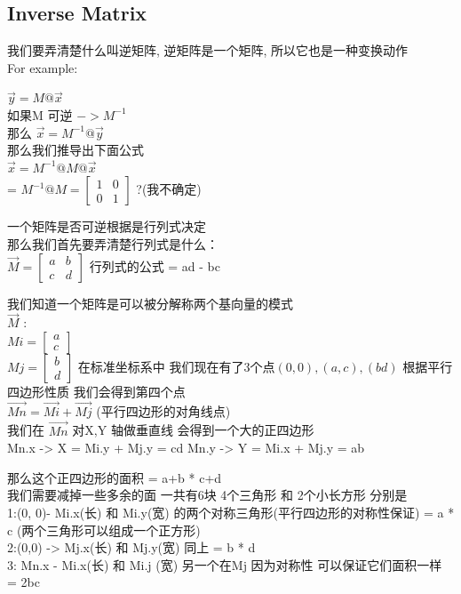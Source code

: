 \documentclass[12pt]{article}
\begin{document}
\begin{flushleft}
\section{Inverse Matrix}
我们要弄清楚什么叫逆矩阵,
逆矩阵是一个矩阵, 所以它也是一种变换动作 \\
For example:

$\vec{y} = M @ \vec{x}$ \\
如果M 可逆 $-> M^{-1}$ \\ 
那么  
$\vec{x} = M^{-1} @ \vec{y}$ \\ 
那么我们推导出下面公式 \\ 
$\vec{x} = M^{-1} @ M  @ \vec{x}$ \\ 
= $M^{-1} @ M  = \begin{bmatrix}
    1 & 0 \\
    0 & 1
\end{bmatrix}$ ?(我不确定)

一个矩阵是否可逆根据是行列式决定  \\
那么我们首先要弄清楚行列式是什么： \\
$\vec{M} = \begin{bmatrix}
    a  &  b  \\
    c  &  d  
\end{bmatrix}$
行列式的公式 =  ad - bc

我们知道一个矩阵是可以被分解称两个基向量的模式 \\
$\vec{M}$ : \\
$ Mi = \begin{bmatrix}
    a \\ 
    c 
\end{bmatrix}
$\\
$ Mj = \begin{bmatrix}
    b \\ 
    d 
\end{bmatrix}$
在标准坐标系中
我们现在有了3个点$(0,0), (a,c), (bd)$ 
根据平行四边形性质 我们会得到第四个点 \\
$\vec{Mn} =  \vec{Mi} + \vec{Mj}$ (平行四边形的对角线点) \\
我们在 $\vec{Mn}$ 对X,Y 轴做垂直线 会得到一个大的正四边形 \\
Mn.x -> X  = Mi.y  +  Mj.y = cd 
Mn.y -> Y  = Mi.x  +  Mj.y = ab 

那么这个正四边形的面积 = a+b * c+d \\ 
我们需要减掉一些多余的面 一共有6块 4个三角形 和 2个小长方形
分别是 \\
1:(0, 0)- Mi.x(长) 和  Mi.y(宽)  的两个对称三角形(平行四边形的对称性保证)
  = a * c (两个三角形可以组成一个正方形) \\
2:(0,0) -> Mj.x(长) 和 Mj.y(宽) 同上
  = b * d \\
3: Mn.x - Mi.x(长) 和 Mi.j (宽)  另一个在Mj 因为对称性 可以保证它们面积一样
  = 2bc \\
  

\end{flushleft}
\end{document}
